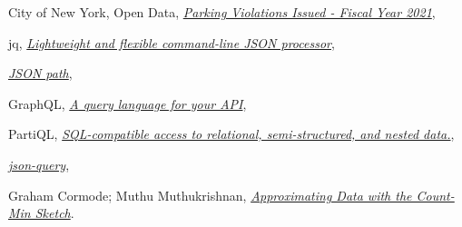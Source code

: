 \documentclass[12pt]{fphw}
\begin{document}
\begin{thebibliography}{9}

  City of New York, Open Data,
  \href{https://data.cityofnewyork.us/City-Government/Parking-Violations-Issued-Fiscal-Year-2021/kvfd-bves}{\emph{Parking Violations Issued - Fiscal Year 2021}},

  jq,
  \href{https://stedolan.github.io/jq/}{\emph{Lightweight and flexible command-line JSON processor}},

  \href{https://goessner.net/articles/JsonPath/}{\emph{JSON path}},

  GraphQL,
  \href{https://graphql.org/}{\emph{A query language for your API}},

  PartiQL,
  \href{https://partiql.org/}{\emph{SQL-compatible access to relational, semi-structured, and nested data.}},

  \href{https://www.npmjs.com/package/json-query}{\emph{json-query}},


  Graham Cormode; Muthu Muthukrishnan,
  \href{https://ieeexplore.ieee.org/document/6042851}{\emph{Approximating Data with the Count-Min Sketch}}.


\end{thebibliography}
\end{document}
